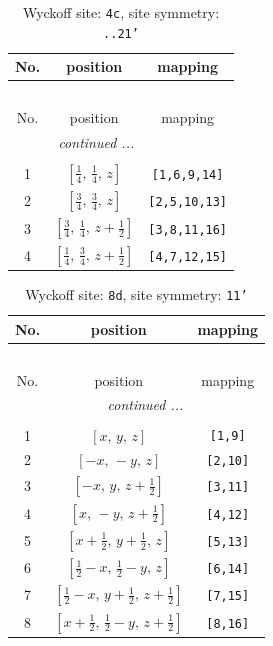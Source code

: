 \documentclass[fleqn,8pt]{jsarticle}
\begin{document}
\renewcommand{\arraystretch}{1.2}
\begin{longtable}{ccc}
\caption{Wyckoff site: {\tt 4c}, site symmetry: {\tt ..21'}}
 \\
 \hline \hline
No. & position & mapping \\ \hline \endfirsthead

\multicolumn{2}{l}{\tablename\ \thetable{}} \\
 \hline \hline
No. & position & mapping \\ \hline \endhead

 \hline \hline
\multicolumn{2}{r}{\footnotesize\it continued ...} \\ \endfoot

 \hline \hline
\multicolumn{2}{r}{} \\ \endlastfoot

1 & $\left[ \frac{1}{4},\, \frac{1}{4},\, z \right]$ & {\tt [1,6,9,14]} \\ \hline
2 & $\left[ \frac{3}{4},\, \frac{3}{4},\, z \right]$ & {\tt [2,5,10,13]} \\ \hline
3 & $\left[ \frac{3}{4},\, \frac{1}{4},\, z + \frac{1}{2} \right]$ & {\tt [3,8,11,16]} \\ \hline
4 & $\left[ \frac{1}{4},\, \frac{3}{4},\, z + \frac{1}{2} \right]$ & {\tt [4,7,12,15]} \\
\end{longtable}
\renewcommand{\arraystretch}{1.2}
\begin{longtable}{ccc}
\caption{Wyckoff site: {\tt 8d}, site symmetry: {\tt 11'}}
 \\
 \hline \hline
No. & position & mapping \\ \hline \endfirsthead

\multicolumn{2}{l}{\tablename\ \thetable{}} \\
 \hline \hline
No. & position & mapping \\ \hline \endhead

 \hline \hline
\multicolumn{2}{r}{\footnotesize\it continued ...} \\ \endfoot

 \hline \hline
\multicolumn{2}{r}{} \\ \endlastfoot

1 & $\left[ x,\, y,\, z \right]$ & {\tt [1,9]} \\ \hline
2 & $\left[ - x,\, - y,\, z \right]$ & {\tt [2,10]} \\ \hline
3 & $\left[ - x,\, y,\, z + \frac{1}{2} \right]$ & {\tt [3,11]} \\ \hline
4 & $\left[ x,\, - y,\, z + \frac{1}{2} \right]$ & {\tt [4,12]} \\ \hline
5 & $\left[ x + \frac{1}{2},\, y + \frac{1}{2},\, z \right]$ & {\tt [5,13]} \\ \hline
6 & $\left[ \frac{1}{2} - x,\, \frac{1}{2} - y,\, z \right]$ & {\tt [6,14]} \\ \hline
7 & $\left[ \frac{1}{2} - x,\, y + \frac{1}{2},\, z + \frac{1}{2} \right]$ & {\tt [7,15]} \\ \hline
8 & $\left[ x + \frac{1}{2},\, \frac{1}{2} - y,\, z + \frac{1}{2} \right]$ & {\tt [8,16]} \\
\end{longtable}
\end{document}
